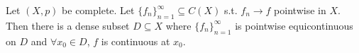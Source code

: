 \begin{thm}
    Let $(X, p)$ be complete. Let $\{f_{n}\}_{n=1}^{\infty} \subseteq C(X)$ s.t. $f_n \to f$ pointwise 
    in $X$. Then there is a dense subset $D \subseteq X$ where $\{f_{n}\}_{n=1}^{\infty}$ is pointwise 
    equicontinuous on $D$ and $\forall x_0 \in D$, $f$ is continuous at $x_0$.
\end{thm}

